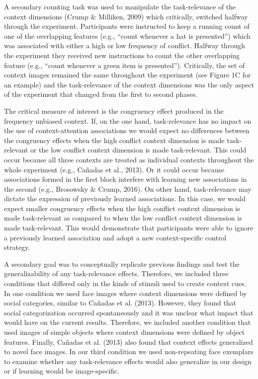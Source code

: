 \documentclass[english,,man,floatsintext]{apa6}
\begin{document}
A secondary counting task was used to manipulate the task-relevance of the context dimensions (Crump \& Milliken, 2009) which critically, switched halfway through the experiment. Participants were instructed to keep a running count of one of the overlapping features (e.g., \enquote{count whenever a hat is presented}) which was associated with either a high or low frequency of conflict. Halfway through the experiment they received new instructions to count the other overlapping feature (e.g., \enquote{count whenever a green item is presented}). Critically, the set of context images remained the same throughout the experiment (see Figure 1C for an example) and the task-relevance of the context dimensions was the only aspect of the experiment that changed from the first to second phases.

The critical measure of interest is the congruency effect produced in the frequency unbiased context. If, on the one hand, task-relevance has no impact on the use of context-attention associations we would expect no differences between the congruency effects when the high conflict context dimension is made task-relevant or the low conflict context dimension is made task-relevant. This could occur because all three contexts are treated as individual contexts throughout the whole experiment (e.g., Cañadas et al., 2013). Or it could occur because associations formed in the first block interfere with learning new associations in the second (e.g., Brosowsky \& Crump, 2016). On other hand, task-relevance may dictate the expression of previously learned associations. In this case, we would expect smaller congruency effects when the high conflict context dimension is made task-relevant as compared to when the low conflict context dimension is made task-relevant. This would demonstrate that participants were able to ignore a previously learned association and adopt a new context-specific control strategy.

A secondary goal was to conceptually replicate previous findings and test the generalizability of any task-relevance effects. Therefore, we included three conditions that differed only in the kinds of stimuli used to create context cues. In one condition we used face images where context dimensions were defined by social categories, similar to Cañadas et al. (2013). However, they found that social categorization occurred spontaneously and it was unclear what impact that would have on the current results. Therefore, we included another condition that used images of simple objects where context dimensions were defined by object features. Finally, Cañadas et al. (2013) also found that context effects generalized to novel face images. In our third condition we used non-repeating face exemplars to examine whether any task-relevance effects would also generalize in our design or if learning would be image-specific.
\end{document}
